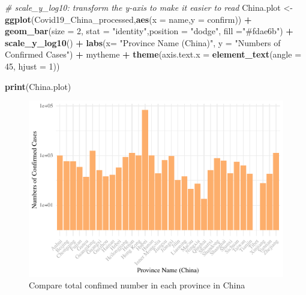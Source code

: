 \documentclass[12pt,]{article}
\newenvironment{Shaded}{\begin{snugshade}}{\end{snugshade}}
\newcommand{\CommentTok}[1]{\textcolor[rgb]{0.56,0.35,0.01}{\textit{#1}}}
\newcommand{\DataTypeTok}[1]{\textcolor[rgb]{0.13,0.29,0.53}{#1}}
\newcommand{\DecValTok}[1]{\textcolor[rgb]{0.00,0.00,0.81}{#1}}
\newcommand{\KeywordTok}[1]{\textcolor[rgb]{0.13,0.29,0.53}{\textbf{#1}}}
\newcommand{\NormalTok}[1]{#1}
\newcommand{\OperatorTok}[1]{\textcolor[rgb]{0.81,0.36,0.00}{\textbf{#1}}}
\newcommand{\StringTok}[1]{\textcolor[rgb]{0.31,0.60,0.02}{#1}}
\begin{document}
\begin{Shaded}
\begin{Highlighting}[]
\CommentTok{# scale_y_log10: transform the y-axis to make it easier to read}
\NormalTok{China.plot <-}\KeywordTok{ggplot}\NormalTok{(Covid19_China_processed,}\KeywordTok{aes}\NormalTok{(}\DataTypeTok{x =}\NormalTok{ name,}\DataTypeTok{y =}\NormalTok{ confirm)) }\OperatorTok{+}\StringTok{ }
\StringTok{  }\KeywordTok{geom_bar}\NormalTok{(}\DataTypeTok{size =} \DecValTok{2}\NormalTok{, }\DataTypeTok{stat =} \StringTok{"identity"}\NormalTok{,}\DataTypeTok{position =} \StringTok{"dodge"}\NormalTok{, }\DataTypeTok{fill =}\StringTok{"#fdae6b"}\NormalTok{) }\OperatorTok{+}\StringTok{ }
\StringTok{  }\KeywordTok{scale_y_log10}\NormalTok{() }\OperatorTok{+}
\StringTok{  }\KeywordTok{labs}\NormalTok{(}\DataTypeTok{x=} \StringTok{"Province Name (China)"}\NormalTok{,}
       \DataTypeTok{y =} \StringTok{"Numbers of Confirmed Cases"}\NormalTok{) }\OperatorTok{+}\StringTok{ }
\StringTok{  }\NormalTok{mytheme }\OperatorTok{+}
\StringTok{  }\KeywordTok{theme}\NormalTok{(}\DataTypeTok{axis.text.x =} \KeywordTok{element_text}\NormalTok{(}\DataTypeTok{angle =} \DecValTok{45}\NormalTok{, }\DataTypeTok{hjust =} \DecValTok{1}\NormalTok{))}

\KeywordTok{print}\NormalTok{(China.plot)}
\end{Highlighting}
\end{Shaded}

\begin{figure}
\centering
\includegraphics{Feng_ENV872_Project_files/figure-latex/China.plot-1.pdf}
\caption{Compare total confimed number in each province in China}
\end{figure}
\end{document}

